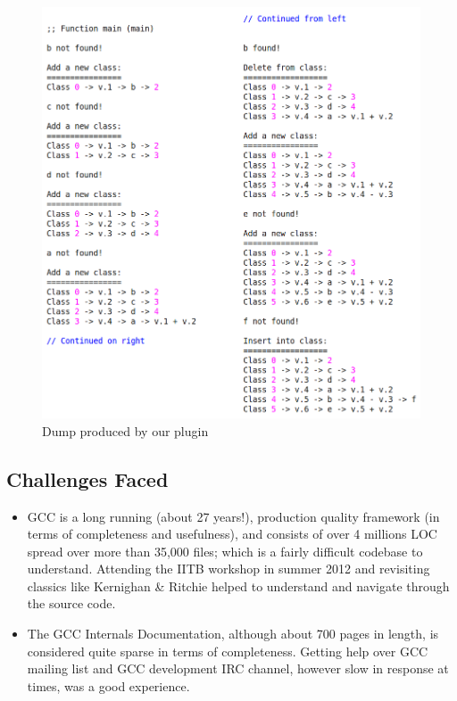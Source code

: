 \begin{figure}[htb]
\centering
\includegraphics{./sagvn}
\caption{Dump produced by our plugin}
\label{fig:sagvn}
\end{figure}

\pagebreak
\subsection{Challenges Faced}
\begin{itemize}
	\item GCC is a long running (about 27 years!), production quality framework (in terms of completeness and usefulness),  and consists of over 4 millions LOC spread over more than 35,000 files\cite{grc}; which is a fairly difficult codebase to understand. Attending the IITB workshop\cite{grc} in summer 2012 and revisiting classics like Kernighan \& Ritchie\cite{kandr} helped to understand and navigate through the source code.
	\item The GCC Internals Documentation\cite{gccint}, although about 700 pages in length, is considered quite sparse in terms of completeness. Getting help over GCC mailing list\cite{gcc-ml} and GCC development IRC channel\cite{gcc-irc}, however slow in response at times, was a good experience.
\end{itemize}
